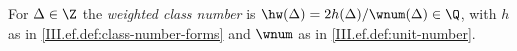 For $\Delta\in\Z$ the \emph{weighted class number} is $\hw(\Delta)=2h(\Delta)/\wnum(\Delta)\in\Q$, with $h$ as in \cref{III.ef.def:class-number-forms}
and $\wnum$ as in \cref{III.ef.def:unit-number}.
